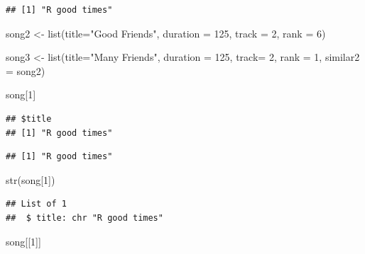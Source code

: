 \documentclass[
]{book}
\newenvironment{Shaded}{\begin{snugshade}}{\end{snugshade}}
\newcommand{\AttributeTok}[1]{\textcolor[rgb]{0.77,0.63,0.00}{#1}}
\newcommand{\DecValTok}[1]{\textcolor[rgb]{0.00,0.00,0.81}{#1}}
\newcommand{\FunctionTok}[1]{\textcolor[rgb]{0.00,0.00,0.00}{#1}}
\newcommand{\NormalTok}[1]{#1}
\newcommand{\OtherTok}[1]{\textcolor[rgb]{0.56,0.35,0.01}{#1}}
\newcommand{\SpecialCharTok}[1]{\textcolor[rgb]{0.00,0.00,0.00}{#1}}
\newcommand{\StringTok}[1]{\textcolor[rgb]{0.31,0.60,0.02}{#1}}
\begin{document}
\begin{verbatim}
## [1] "R good times"
\end{verbatim}

\begin{Shaded}
\begin{Highlighting}[]
\NormalTok{song2 }\OtherTok{\textless{}{-}} \FunctionTok{list}\NormalTok{(}\AttributeTok{title=}\StringTok{"Good Friends"}\NormalTok{, }
              \AttributeTok{duration =} \DecValTok{125}\NormalTok{,}
              \AttributeTok{track =} \DecValTok{2}\NormalTok{,}
              \AttributeTok{rank =} \DecValTok{6}\NormalTok{)}

\NormalTok{song3 }\OtherTok{\textless{}{-}} \FunctionTok{list}\NormalTok{(}\AttributeTok{title=}\StringTok{"Many Friends"}\NormalTok{, }
              \AttributeTok{duration =} \DecValTok{125}\NormalTok{,}
              \AttributeTok{track=} \DecValTok{2}\NormalTok{,}
              \AttributeTok{rank =} \DecValTok{1}\NormalTok{,}
              \AttributeTok{similar2 =}\NormalTok{ song2)}

\NormalTok{song[}\DecValTok{1}\NormalTok{]}
\end{Highlighting}
\end{Shaded}

\begin{verbatim}
## $title
## [1] "R good times"
\end{verbatim}

\begin{Shaded}
\end{Shaded}

\begin{verbatim}
## [1] "R good times"
\end{verbatim}

\begin{Shaded}
\begin{Highlighting}[]
\FunctionTok{str}\NormalTok{(song[}\DecValTok{1}\NormalTok{])}
\end{Highlighting}
\end{Shaded}

\begin{verbatim}
## List of 1
##  $ title: chr "R good times"
\end{verbatim}

\begin{Shaded}
\begin{Highlighting}[]
\NormalTok{song[[}\DecValTok{1}\NormalTok{]]}
\end{Highlighting}
\end{Shaded}
\end{document}

